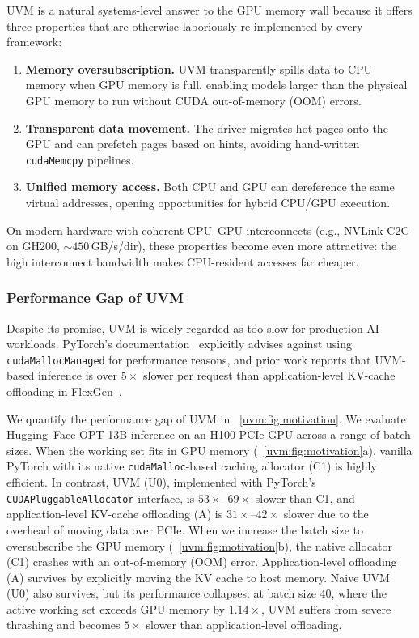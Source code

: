 UVM is a natural systems-level answer to the GPU memory wall
    because it offers three properties that are otherwise
    laboriously re-implemented by every framework:
\begin{enumerate}
\item \textbf{Memory oversubscription.}
    UVM transparently spills data to CPU memory
    when GPU memory is full,
    enabling models larger than the physical GPU memory to run
    without CUDA out-of-memory (OOM) errors.
\item \textbf{Transparent data movement.}
    The driver migrates hot pages onto the GPU
    and can prefetch pages based on hints,
    avoiding hand-written \texttt{cudaMemcpy} pipelines.
\item \textbf{Unified memory access.}
    Both CPU and GPU can dereference the same virtual addresses,
    opening opportunities for hybrid CPU/GPU execution.
\end{enumerate}

On modern hardware with coherent CPU--GPU interconnects
    (e.g., NVLink-C2C on GH200, $\sim$$450$\,GB/s/dir),
    these properties become even more attractive:
    the high interconnect bandwidth makes CPU-resident accesses far cheaper.


\subsubsection{Performance Gap of UVM}
\label{uvm:sec:bg:gap}

Despite its promise, UVM is widely regarded as too slow for production AI workloads.
PyTorch's documentation~\cite{pytorch-cuda-allocators} explicitly advises against
    using \texttt{cudaMallocManaged} for performance reasons,
    and prior work reports that UVM-based inference
    is over $5\times$ slower per request
    than application-level KV-cache offloading
    in FlexGen~\cite{flexgen, infinigen}.

We quantify the performance gap of UVM in \figurename~\ref{uvm:fig:motivation}.
We evaluate Hugging~Face OPT-13B inference on an H100 PCIe GPU across a range of batch sizes.
When the working set fits in GPU memory (\figurename~\ref{uvm:fig:motivation}a),
    vanilla PyTorch with its native \texttt{cudaMalloc}-based caching allocator (C1)
    is highly efficient.
In contrast, UVM (U0), implemented with PyTorch's \texttt{CUDAPluggableAllocator} interface, is $53\times$--$69\times$ slower than C1,
    and application-level KV-cache offloading (A) is $31\times$--$42\times$ slower
    due to the overhead of moving data over PCIe.
When we increase the batch size to oversubscribe the GPU memory (\figurename~\ref{uvm:fig:motivation}b),
    the native allocator (C1) crashes with an out-of-memory (OOM) error.
Application-level offloading (A) survives by explicitly moving the KV cache to host memory.
Naive UVM (U0) also survives, but its performance collapses:
    at batch size $40$, where the active working set exceeds GPU memory by $1.14\times$,
    UVM suffers from severe thrashing and becomes $5\times$ slower than application-level offloading.

